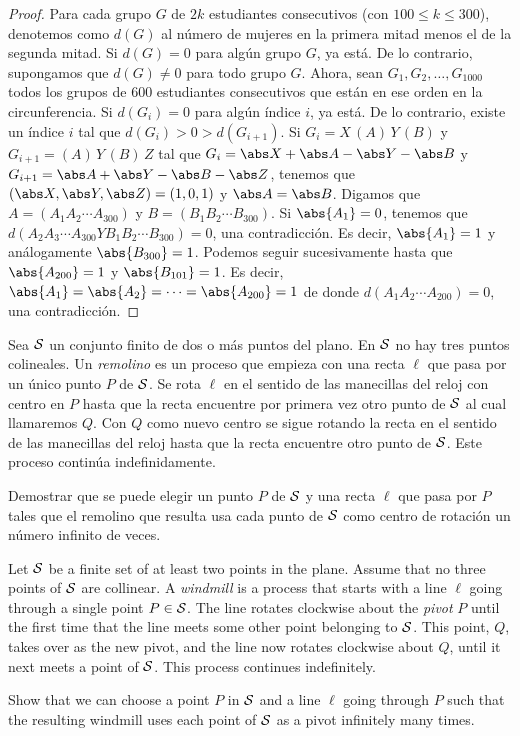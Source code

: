 \begin{proof}
  Para cada grupo $G$ de $2k$ estudiantes consecutivos (con $100\le k\le 300$),
  denotemos como $d(G)$ al número de mujeres en la primera mitad menos el de la
  segunda mitad. Si $d(G)=0$ para algún grupo $G$, ya está. De lo contrario,
  supongamos que $d(G)\ne 0$ para todo grupo $G$. Ahora, sean
  $G_1,G_2,\dots,G_{1000}$ todos los grupos de $600$ estudiantes consecutivos
  que están en ese orden en la circunferencia. Si $d(G_i)=0$ para algún índice
  $i$, ya está. De lo contrario, existe un índice $i$ tal que
  $d(G_i)>0>d(G_{i+1})$. Si $G_i=X\,(A)\,Y\,(B)$ y $G_{i+1}=(A)\,Y\,(B)\,Z$ tal
  que $G_i=\abs X+\abs A-\abs Y-\abs B$ y $G_{i+1}=\abs A+\abs Y-\abs B-\abs Z$,
  tenemos que $(\abs X,\abs Y,\abs Z)=(1,0,1)$ y $\abs A=\abs B$. Digamos que
  $A=(A_1A_2\cdots A_{300})$ y $B=(B_1B_2\cdots B_{300})$. Si $\abs{A_1}=0$,
  tenemos que $d(A_2A_3\cdots A_{300}YB_1B_2\cdots B_{300})=0$, una
  contradicción. Es decir, $\abs{A_1}=1$ y análogamente $\abs{B_{300}}=1$.
  Podemos seguir sucesivamente hasta que $\abs{A_{200}}=1$ y $\abs{B_{101}}=1$.
  Es decir, $\abs{A_1}=\abs{A_2}=\dots=\abs{A_{200}}=1$ de donde
  $d(A_1A_2\cdots A_{200})=0$, una contradicción.
\end{proof}

\begin{probMG}[%
    ISL 2011/C3\protect\footnote{%
      IMO 2011/2; como referencia un video de 3Blue1Brown:
      \url{https://www.youtube.com/watch?v=M64HUIJFTZM}.%
    }%
  ]
  Sea $\cal S$ un conjunto finito de dos o más puntos del plano. En $\cal S$ no
  hay tres puntos colineales. Un \emph{remolino} es un proceso que empieza con
  una recta $\ell$ que pasa por un único punto $P$ de $\cal S$. Se rota $\ell$
  en el sentido de las manecillas del reloj con centro en $P$ hasta que la recta
  encuentre por primera vez otro punto de $\cal S$ al cual llamaremos $Q$. Con
  $Q$ como nuevo centro se sigue rotando la recta en el sentido de las
  manecillas del reloj hasta que la recta encuentre otro punto de $\cal S$. Este
  proceso continúa indefinidamente.

  Demostrar que se puede elegir un punto $P$ de $\cal S$ y una recta $\ell$ que
  pasa por $P$ tales que el remolino que resulta usa cada punto de $\cal S$ como
  centro de rotación un número infinito de veces.
  \begin{hint}
    Let $\cal S$ be a finite set of at least two points in the plane. Assume
    that no three points of $\cal S$ are collinear. A \emph{windmill} is a
    process that starts with a line $\ell$ going through a single point
    $P\in\cal S$. The line rotates clockwise about the \emph{pivot} $P$ until
    the first time that the line meets some other point belonging to $\cal S$.
    This point, $Q$, takes over as the new pivot, and the line now rotates
    clockwise about $Q$, until it next meets a point of $\cal S$. This process
    continues indefinitely.

    Show that we can choose a point $P$ in $\cal S$ and a line $\ell$ going
    through $P$ such that the resulting windmill uses each point of $\cal S$ as
    a pivot infinitely many times.
  \end{hint}
\end{probMG}

